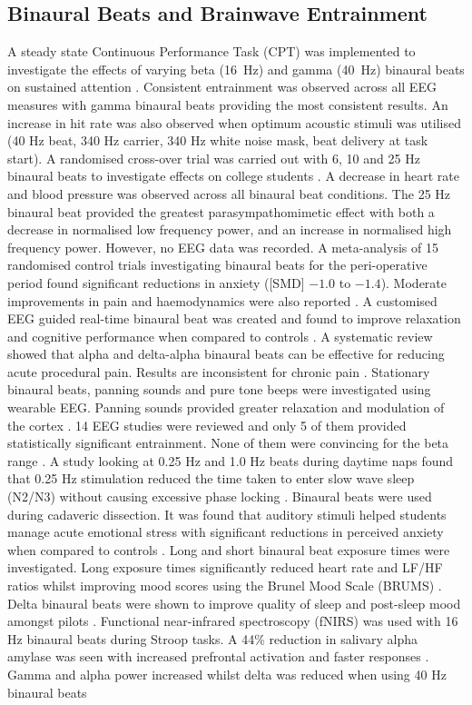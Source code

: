 \documentclass[12pt, a4paper]{report}
\begin{document}
\subsection{Binaural Beats and Brainwave Entrainment}
\label{subsec:lit_binaural_beats}
A steady state Continuous Performance Task (CPT) was implemented to investigate the effects of varying beta (16~Hz)  and gamma (40~Hz)  binaural beats on sustained attention  \cite{Melnichuk2025} . Consistent entrainment was observed across all EEG measures with gamma binaural beats providing the most consistent results. An increase in hit rate was also observed when optimum acoustic stimuli was utilised (40 Hz beat, 340 Hz carrier, 340 Hz white noise mask, beat delivery at task start). A randomised cross-over trial was carried out with 6, 10 and 25 Hz binaural beats to investigate effects on college students  \cite{Yang2025} . A decrease in heart rate and blood pressure was observed across all binaural beat conditions. The 25 Hz binaural beat provided the greatest parasympathomimetic effect with both a decrease in normalised low frequency power, and an increase in normalised high frequency power. However, no EEG data was recorded. A meta-analysis of 15 randomised control trials investigating binaural beats for the peri-operative period found significant reductions in anxiety ([SMD] $-1.0$ to $-1.4$). Moderate improvements in pain and haemodynamics were also reported \cite{Xiong2025}. A customised EEG guided real-time binaural beat was created and found to improve relaxation and cognitive performance when compared to controls  \cite{KahathuduwaBlume2025}. A systematic review showed that alpha and delta-alpha binaural beats can be effective for reducing acute procedural pain. Results are inconsistent for chronic pain \cite{Shamsi2024}. Stationary binaural beats, panning sounds and pure tone beeps were investigated using wearable EEG. Panning sounds provided greater relaxation and modulation of the cortex  \cite{Sudre2024}. 14 EEG studies were reviewed and only 5 of them provided statistically significant entrainment. None of them were convincing for the beta range \cite{Ingendoh2023}. A study looking at 0.25 Hz and 1.0 Hz beats during daytime naps found that 0.25 Hz stimulation reduced the time taken to enter slow wave sleep (N2/N3) without causing excessive phase locking \cite{Fan2024}. Binaural beats were used during cadaveric dissection. It was found that auditory stimuli helped students manage acute emotional stress with significant reductions in perceived anxiety when compared to controls \cite{Mosheshe2024}. Long and short binaural beat exposure times were investigated. Long exposure times significantly reduced heart rate and LF/HF ratios whilst improving mood scores using the Brunel Mood Scale (BRUMS) \cite{ChockboondeeJatupornpoonsub2023}. Delta binaural beats were shown to improve quality of sleep and post-sleep mood amongst pilots \cite{Dabiri2022}. Functional near-infrared spectroscopy (fNIRS) was used with 16 Hz binaural beats during Stroop tasks. A 44\% reduction in salivary alpha amylase was seen with increased prefrontal activation and faster responses \cite{AlShargie2022}. Gamma and alpha power increased whilst delta was reduced when using 40 Hz binaural beats 
\end{document}
